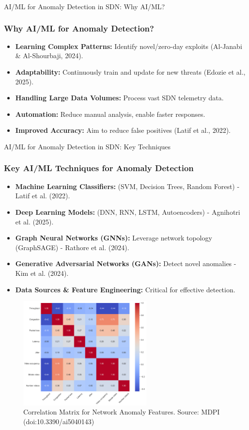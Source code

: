 \documentclass{beamer}
\begin{document}
\begin{frame}{AI/ML for Anomaly Detection in SDN: Why AI/ML?}
  \frametitle{Why AI/ML for Anomaly Detection?}
   \begin{itemize}
    \item \textbf{Learning Complex Patterns:} Identify novel/zero-day exploits (Al-Janabi \& Al-Shourbaji, 2024).
    \item \textbf{Adaptability:} Continuously train and update for new threats (Edozie et al., 2025).
    \item \textbf{Handling Large Data Volumes:} Process vast SDN telemetry data.
    \item \textbf{Automation:} Reduce manual analysis, enable faster responses.
    \item \textbf{Improved Accuracy:} Aim to reduce false positives (Latif et al., 2022).
  \end{itemize}
\end{frame}

\begin{frame}{AI/ML for Anomaly Detection in SDN: Key Techniques}
  \frametitle{Key AI/ML Techniques for Anomaly Detection}
  \begin{itemize}
    \item \textbf{Machine Learning Classifiers:} (SVM, Decision Trees, Random Forest) - Latif et al. (2022).
    \item \textbf{Deep Learning Models:} (DNN, RNN, LSTM, Autoencoders) - Agnihotri et al. (2025).
    \item \textbf{Graph Neural Networks (GNNs):} Leverage network topology (GraphSAGE) - Rathore et al. (2024).
    \item \textbf{Generative Adversarial Networks (GANs):} Detect novel anomalies - Kim et al. (2024).
    \item \textbf{Data Sources \& Feature Engineering:} Critical for effective detection.
  \end{itemize}
  \begin{figure}
    \centering
    \includegraphics[width=0.6\textwidth]{figures/mdpi_correlation_matrix_ai_ml.png}
    \caption{Correlation Matrix for Network Anomaly Features. Source: MDPI (doi:10.3390/ai5040143)}
  \end{figure}
\end{frame}
\end{document}
